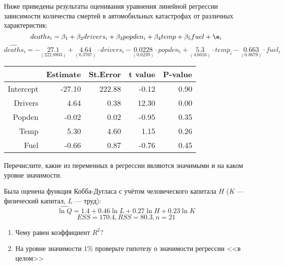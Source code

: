 \documentclass[pdftex,11pt,openany]{book}\usepackage[]{graphicx}\usepackage[]{color}
\begin{document}
\begin{problem}
 Ниже приведены результаты оценивания уравнения линейной регрессии зависимости количества смертей в автомобильных катастрофах от различных характеристик:
\[
deaths_i = \beta_1 + \beta_2 drivers_i + \beta_3 popden_i + \beta_4  temp + \beta_5 fuel + \e_i
\]
\ensuremath{\widehat{deaths}_i=-\underset{(222.8803)}{27.1}+\underset{(  0.3767)}{4.64}\cdot drivers_i-\underset{(  0.0239)}{0.0228}\cdot popden_i+\underset{(  4.6016)}{5.3}\cdot temp_i-\underset{(  0.8679)}{0.663}\cdot fuel_i}%
\begin{table}[ht]
\centering
\begin{tabular}{rrrrr}
  \hline
 & Estimate & St.Error & t value & P-value \\ 
  \hline
Intercept & -27.10 & 222.88 & -0.12 & 0.90 \\ 
  Drivers & 4.64 & 0.38 & 12.30 & 0.00 \\ 
  Popden & -0.02 & 0.02 & -0.95 & 0.35 \\ 
  Temp & 5.30 & 4.60 & 1.15 & 0.26 \\ 
  Fuel & -0.66 & 0.87 & -0.76 & 0.45 \\ 
   \hline
\end{tabular}
\end{table}

Перечислите, какие из переменных в регрессии являются значимыми и на каком уровне значимости.
\end{problem}

\begin{solution}
\end{solution}


\begin{problem}
 Была оценена функция Кобба-Дугласа с учётом человеческого капитала $H$ ($K$ --- физический капитал, $L$ --- труд): 
\[ 
\widehat{\ln Q} = 1.4 + 0.46\ln L + 0.27\ln H + 0.23\ln K
\] 
\[
ESS = 170.4, RSS = 80.3, n = 21
\]
\begin{enumerate}
\item Чему равен коэффициент $R^2$?
\item На уровне значимости $1\%$ проверьте гипотезу о значимости регрессии <<в целом>>
\end{enumerate}
\end{problem}
\end{document}
